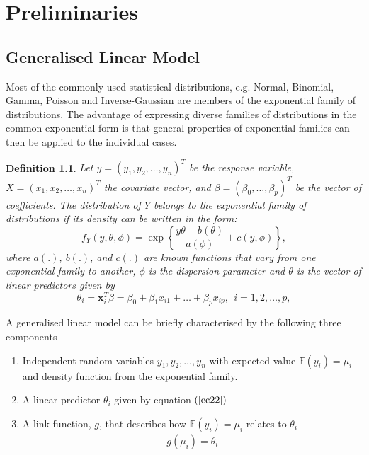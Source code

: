 \documentclass[a4paper,12pt,openany]{report}
\theoremstyle{plain}
\theoremstyle{plain}
\theoremstyle{plain}
\theoremstyle{plain}
\theoremstyle{plain}
\theoremstyle{plain}
\theoremstyle{plain}
\newtheorem{definition}{\textbf{Definition}}[section]
\theoremstyle{plain}
\theoremstyle{plain}
\theoremstyle{plain}
\theoremstyle{plain}
\theoremstyle{plain}
\begin{document}
\chapter{Preliminaries}
\section{Generalised Linear Model}
Most of the commonly used statistical distributions, e.g. Normal,
Binomial, Gamma, Poisson and Inverse-Gaussian are members of the exponential family of
distributions. The advantage of expressing diverse families of distributions in the common exponential form
is that general properties of exponential families can then be applied to the individual cases.
\begin{definition}
	Let $y=(y_1, y_2,\dots, y_n)^T$ be the response variable, $X=(x_1, x_2, \dots, x_n)^T$ the covariate vector, and $\beta = (\beta_0,\ldots,\beta_p)^T$ be the vector of coefficients. The distribution of $Y$ belongs to the exponential family of distributions if its density can be written in the form:
	\begin{equation}\label{ec21}
	f_Y(y,\theta,\phi)=\exp\left\lbrace\frac{y\theta-b(\theta)}{a(\phi)}+c(y,\phi)\right\rbrace,
	\end{equation}
	where $a(.)$, $b(.)$, and $c(.)$ are known functions that vary from one exponential family to another, $\phi$ is the dispersion parameter and $\theta$ is the vector of linear predictors given by
	\begin{equation}\label{ec22}
	\theta_i=\mathbf{x}_i^T\beta=\beta_0+\beta_1x_{i1}+\dots+\beta_px_{ip}, \ \ i=1,2,\dots, p,
	\end{equation} 
	
\end{definition}
A generalised linear model can be briefly characterised by the following three components
\begin{enumerate}
	\item Independent random variables $y_1, y_2,\dots, y_n$ with expected value $\mathbb{E}(y_i)=\mu_i$ and density function from the exponential family.\\
	\item A linear predictor $\theta_i$ given by equation $(\ref{ec22})$\\
	\item A link function, $g$, that describes how $\mathbb{E}(y_i)=\mu_i$ relates to $\theta_i$
	\begin{eqnarray}
	g(\mu_i)=\theta_i
	\end{eqnarray}
\end{enumerate}
\end{document}
